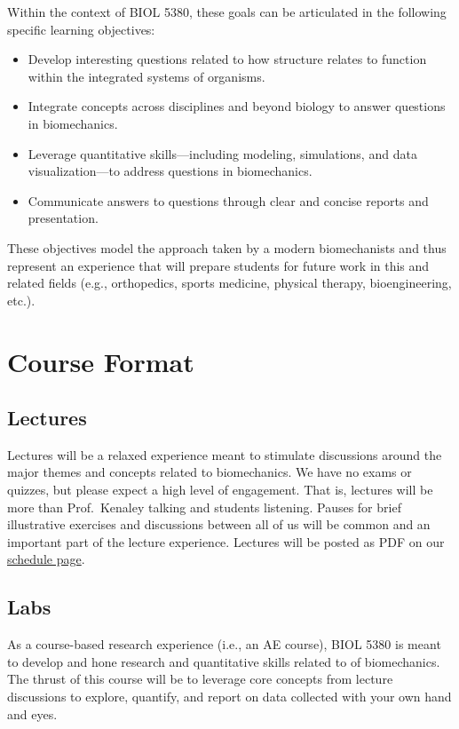 \documentclass[
]{article}
\begin{document}
Within the context of BIOL 5380, these goals can be articulated in the
following specific learning objectives:

\begin{itemize}
\item
  Develop interesting questions related to how structure relates to
  function within the integrated systems of organisms.
\item
  Integrate concepts across disciplines and beyond biology to answer
  questions in biomechanics.
\item
  Leverage quantitative skills---including modeling, simulations, and
  data visualization---to address questions in biomechanics.
\item
  Communicate answers to questions through clear and concise reports and
  presentation.
\end{itemize}

These objectives model the approach taken by a modern biomechanists and
thus represent an experience that will prepare students for future work
in this and related fields (e.g., orthopedics, sports medicine, physical
therapy, bioengineering, etc.).

\hypertarget{course-format}{%
\section{Course Format}\label{course-format}}

\hypertarget{lectures}{%
\subsection{Lectures}\label{lectures}}

Lectures will be a relaxed experience meant to stimulate discussions
around the major themes and concepts related to biomechanics. We have no
exams or quizzes, but please expect a high level of engagement. That is,
lectures will be more than Prof.~Kenaley talking and students listening.
Pauses for brief illustrative exercises and discussions between all of
us will be common and an important part of the lecture experience.
Lectures will be posted as PDF on our \href{schedule.html}{schedule
page}.

\hypertarget{labs}{%
\subsection{Labs}\label{labs}}

As a course-based research experience (i.e., an AE course), BIOL 5380 is
meant to develop and hone research and quantitative skills related to of
biomechanics. The thrust of this course will be to leverage core
concepts from lecture discussions to explore, quantify, and report on
data collected with your own hand and eyes.
\end{document}
